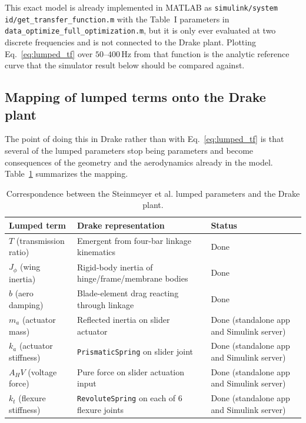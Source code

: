 \documentclass{article}
\begin{document}
This exact model is already implemented in MATLAB as \texttt{simulink/system id/get\_transfer\_function.m} with the Table~I parameters in \texttt{data\_optimize\_full\_optimization.m}, but it is only ever evaluated at two discrete frequencies and is not connected to the Drake plant. Plotting Eq.~\eqref{eq:lumped_tf} over \(50\)--\(400\,\mathrm{Hz}\) from that function is the analytic reference curve that the simulator result below should be compared against.

\subsection{Mapping of lumped terms onto the Drake plant}
The point of doing this in Drake rather than with Eq.~\eqref{eq:lumped_tf} is that several of the lumped parameters stop being parameters and become consequences of the geometry and the aerodynamics already in the model. Table~\ref{tab:lumped_map} summarizes the mapping.

\begin{table}[H]
\centering
\begin{tabular}{l l l}
\hline
Lumped term & Drake representation & Status \\
\hline
\(T\) (transmission ratio) & Emergent from four-bar linkage kinematics & Done \\
\(J_\phi\) (wing inertia) & Rigid-body inertia of hinge/frame/membrane bodies & Done \\
\(b\) (aero damping) & Blade-element drag reacting through linkage & Done \\
\(m_a\) (actuator mass) & Reflected inertia on slider actuator & Done (standalone app and Simulink server) \\
\(k_a\) (actuator stiffness) & \texttt{PrismaticSpring} on slider joint & Done (standalone app and Simulink server) \\
\(A_H V\) (voltage force) & Pure force on slider actuation input & Done (standalone app and Simulink server) \\
\(k_t\) (flexure stiffness) & \texttt{RevoluteSpring} on each of 6 flexure joints & Done (standalone app and Simulink server) \\
\hline
\end{tabular}
\caption{Correspondence between the Steinmeyer et al. lumped parameters and the Drake plant.}
\label{tab:lumped_map}
\end{table}
\end{document}
